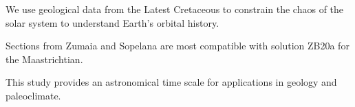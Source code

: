 \documentclass[draft]{agujournal2019}
\begin{document}

\begin{keypoints}
\item We use geological data from the Latest Cretaceous to constrain the chaos of the solar system to understand Earth's orbital history.
\item Sections from Zumaia and Sopelana are most compatible with solution ZB20a for the Maastrichtian.
\item This study provides an astronomical time scale for applications in geology and paleoclimate.
\end{keypoints}

%
%

%
%

\end{document}
